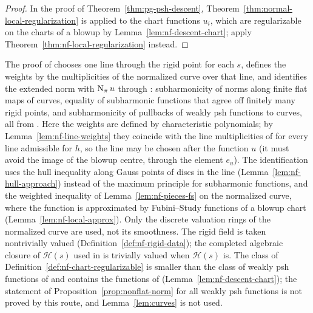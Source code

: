 \begin{proof}
In the proof of Theorem~\ref{thm:pg-psh-descent}, Theorem~\ref{thm:normal-local-regularization} is applied to the chart
functions $u_i$, which are regularizable on the charts of a blowup by Lemma~\ref{lem:nf-descent-chart}; apply
Theorem~\ref{thm:nf-local-regularization} instead.
\end{proof}

\begin{remark}\label{rmk:nf-source}
The proof of \cite[Proposition~5.22]{FHX} chooses one line through the rigid point for each $s$, defines the weights by
the multiplicities of the normalized curve over that line, and identifies the extended norm with $\operatorname{N}_\pi u$ through
\cite[Lemma~5.21]{FHX}: subharmonicity of norms along finite flat maps of curves, equality of subharmonic functions that
agree off finitely many rigid points, and subharmonicity of pullbacks of weakly psh functions to curves, all from
\cite[Proposition~3.5(1),(4),(6),(8) and Proposition~4.2]{GR25}. Here the weights are defined by characteristic
polynomials; by Lemma~\ref{lem:nf-line-weights} they coincide with the line multiplicities of \cite{FHX} for every line
admissible for $h$, so the line may be chosen after the function $u$ (it must avoid the image of the blowup centre,
through the element $e_u$). The identification uses the hull inequality along Gauss points of discs in the line
(Lemma~\ref{lem:nf-hull-approach}) instead of the maximum principle for subharmonic functions, and the weighted inequality
of Lemma~\ref{lem:nf-pieces-fs} on the normalized curve, where the function is approximated by Fubini--Study functions of
a blowup chart (Lemma~\ref{lem:nf-local-approx}). Only the discrete valuation rings of the normalized curve are used, not
its smoothness. The rigid field is taken nontrivially valued (Definition~\ref{def:nf-rigid-data}); the completed
algebraic closure of $\mathcal H(s)$ used in \cite{FHX} is trivially valued when $\mathcal H(s)$ is. The class of
Definition~\ref{def:nf-chart-regularizable} is smaller than the class of weakly psh functions of \cite[Proposition~5.22]{FHX}
and contains the functions of \cite[Corollary~5.26]{FHX} (Lemma~\ref{lem:nf-descent-chart}); the statement of
Proposition~\ref{prop:nonflat-norm} for all weakly psh functions is not proved by this route, and Lemma~\ref{lem:curves}
is not used.
\end{remark}
